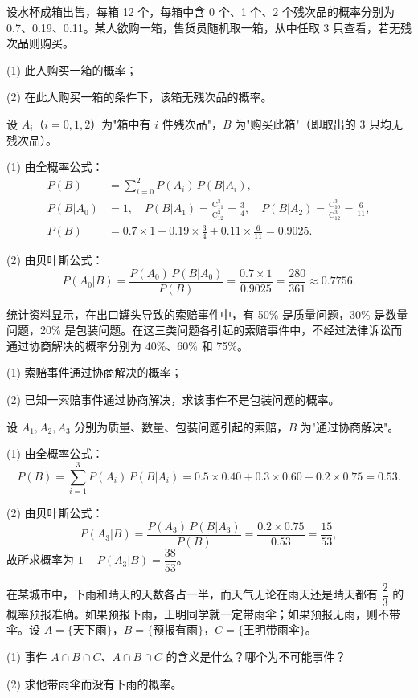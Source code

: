 \documentclass[lang=cn,11pt]{elegantbook}
\begin{document}
\begin{exercise}\label{exer:1-52}
设水杯成箱出售，每箱 12 个，每箱中含 0 个、1 个、2 个残次品的概率分别为 0.7、0.19、0.11。某人欲购一箱，售货员随机取一箱，从中任取 3 只查看，若无残次品则购买。\par
(1) 此人购买一箱的概率；\par
(2) 在此人购买一箱的条件下，该箱无残次品的概率。
\end{exercise}

\begin{solution}
设 \(A_i\)（\(i=0,1,2\)）为"箱中有 \(i\) 件残次品"，\(B\) 为"购买此箱"（即取出的 3 只均无残次品）。

(1) 由全概率公式：
\begin{align*}
P(B) &= \sum_{i=0}^{2}P(A_i)\,P(B|A_i), \\
P(B|A_0) &= 1, \quad P(B|A_1) = \frac{\mathrm{C}_{11}^3}{\mathrm{C}_{12}^3} = \frac{3}{4}, \quad P(B|A_2) = \frac{\mathrm{C}_{10}^3}{\mathrm{C}_{12}^3} = \frac{6}{11}, \\
P(B) &= 0.7\times 1 + 0.19\times\frac{3}{4} + 0.11\times\frac{6}{11} = 0.9025.
\end{align*}

(2) 由贝叶斯公式：
\[
P(A_0|B) = \frac{P(A_0)\,P(B|A_0)}{P(B)} = \frac{0.7\times 1}{0.9025} = \frac{280}{361} \approx 0.7756.
\]
\end{solution}

\begin{exercise}\label{exer:1-53}
统计资料显示，在出口罐头导致的索赔事件中，有 50\% 是质量问题，30\% 是数量问题，20\% 是包装问题。在这三类问题各引起的索赔事件中，不经过法律诉讼而通过协商解决的概率分别为 40\%、60\% 和 75\%。\par
(1) 索赔事件通过协商解决的概率；\par
(2) 已知一索赔事件通过协商解决，求该事件不是包装问题的概率。
\end{exercise}

\begin{solution}
设 \(A_1,A_2,A_3\) 分别为质量、数量、包装问题引起的索赔，\(B\) 为"通过协商解决"。

(1) 由全概率公式：
\[
P(B) = \sum_{i=1}^{3}P(A_i)\,P(B|A_i) = 0.5\times 0.40 + 0.3\times 0.60 + 0.2\times 0.75 = 0.53.
\]

(2) 由贝叶斯公式：
\[
P(A_3|B) = \frac{P(A_3)\,P(B|A_3)}{P(B)} = \frac{0.2\times 0.75}{0.53} = \frac{15}{53},
\]
故所求概率为 \(1-P(A_3|B) = \dfrac{38}{53}\)。
\end{solution}

\begin{exercise}\label{exer:1-54}
在某城市中，下雨和晴天的天数各占一半，而天气无论在雨天还是晴天都有 \(\dfrac{2}{3}\) 的概率预报准确。如果预报下雨，王明同学就一定带雨伞；如果预报无雨，则不带伞。设 \(A=\{\text{天下雨}\}\)，\(B=\{\text{预报有雨}\}\)，\(C=\{\text{王明带雨伞}\}\)。\par
(1) 事件 \(\overline{A}\cap\overline{B}\cap C\)、\(\overline{A}\cap B\cap C\) 的含义是什么？哪个为不可能事件？\par
(2) 求他带雨伞而没有下雨的概率。
\end{exercise}
\end{document}
